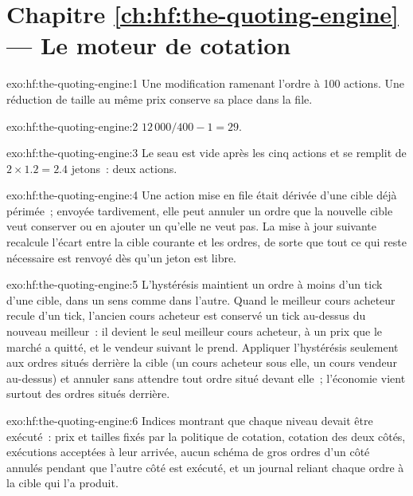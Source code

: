 \section*{Chapitre \ref{ch:hf:the-quoting-engine} --- Le moteur de cotation}

\begin{solution}{exo:hf:the-quoting-engine:1}
Une modification ramenant l'ordre à 100 actions. Une réduction de taille au même prix conserve sa place dans la file.
\end{solution}

\begin{solution}{exo:hf:the-quoting-engine:2}
$12\,000/400-1=29$.
\end{solution}

\begin{solution}{exo:hf:the-quoting-engine:3}
Le seau est vide après les cinq actions et se remplit de $2\times1.2=2.4$ jetons~: deux actions.
\end{solution}

\begin{solution}{exo:hf:the-quoting-engine:4}
Une action mise en file était dérivée d'une cible déjà périmée~; envoyée tardivement, elle peut annuler un ordre que la nouvelle cible veut conserver ou en ajouter un qu'elle ne veut pas. La
mise à jour suivante recalcule l'écart entre la cible courante et les ordres, de sorte que tout ce qui reste nécessaire est renvoyé dès qu'un jeton est
libre.
\end{solution}

\begin{solution}{exo:hf:the-quoting-engine:5}
L'hystérésis maintient un ordre à moins d'un tick d'une cible, dans un sens comme dans l'autre. Quand le meilleur cours acheteur recule d'un tick, l'ancien cours acheteur est conservé un tick au-dessus
du nouveau meilleur~: il devient le seul meilleur cours acheteur, à un prix que le marché a quitté, et le vendeur suivant le prend. Appliquer l'hystérésis seulement aux ordres
situés derrière la cible (un cours acheteur sous elle, un cours vendeur au-dessus) et annuler sans attendre tout ordre situé devant elle~; l'économie vient surtout des ordres situés derrière.
\end{solution}

\begin{solution}{exo:hf:the-quoting-engine:6}
Indices montrant que chaque niveau devait être exécuté~: prix et tailles fixés par la politique de cotation, cotation des deux côtés, exécutions acceptées à leur arrivée, aucun schéma
de gros ordres d'un côté annulés pendant que l'autre côté est exécuté, et un journal reliant chaque ordre à la cible qui l'a produit.
\end{solution}

